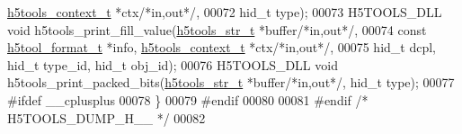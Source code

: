 \begin{DoxyCode}
      \hyperlink{structh5tools__context__t}{h5tools\_context\_t} *ctx\textcolor{comment}{/*in,out*/},
00072                             hid\_t type);
00073 H5TOOLS\_DLL \textcolor{keywordtype}{void}    h5tools\_print\_fill\_value(\hyperlink{structh5tools__str__t}{h5tools\_str\_t} *buffer\textcolor{comment}{/*in,out*/},
00074                             \textcolor{keyword}{const} \hyperlink{structh5tool__format__t}{h5tool\_format\_t} *info, 
      \hyperlink{structh5tools__context__t}{h5tools\_context\_t} *ctx\textcolor{comment}{/*in,out*/}, 
00075                             hid\_t dcpl, hid\_t type\_id, hid\_t obj\_id);
00076 H5TOOLS\_DLL \textcolor{keywordtype}{void}    h5tools\_print\_packed\_bits(\hyperlink{structh5tools__str__t}{h5tools\_str\_t} *buffer\textcolor{comment}{/*in,out*/}, hid\_t type);
00077 \textcolor{preprocessor}{#ifdef \_\_cplusplus}
00078 \}
00079 \textcolor{preprocessor}{#endif}
00080 
00081 \textcolor{preprocessor}{#endif }\textcolor{comment}{/* H5TOOLS\_DUMP\_H\_\_ */}\textcolor{preprocessor}{}
00082 
\end{DoxyCode}
